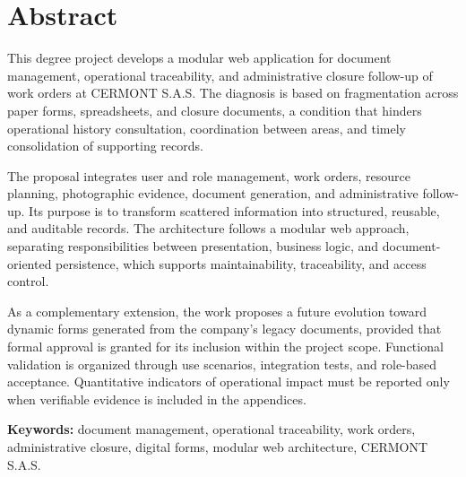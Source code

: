\chapter*{Abstract}

This degree project develops a modular web application for document management, operational traceability, and administrative closure follow-up of work orders at CERMONT S.A.S. The diagnosis is based on fragmentation across paper forms, spreadsheets, and closure documents, a condition that hinders operational history consultation, coordination between areas, and timely consolidation of supporting records.

The proposal integrates user and role management, work orders, resource planning, photographic evidence, document generation, and administrative follow-up. Its purpose is to transform scattered information into structured, reusable, and auditable records. The architecture follows a modular web approach, separating responsibilities between presentation, business logic, and document-oriented persistence, which supports maintainability, traceability, and access control.

As a complementary extension, the work proposes a future evolution toward dynamic forms generated from the company's legacy documents, provided that formal approval is granted for its inclusion within the project scope. Functional validation is organized through use scenarios, integration tests, and role-based acceptance. Quantitative indicators of operational impact must be reported only when verifiable evidence is included in the appendices.

\vspace{0.5cm}
\noindent\textbf{Keywords:} document management, operational traceability, work orders, administrative closure, digital forms, modular web architecture, CERMONT S.A.S.
